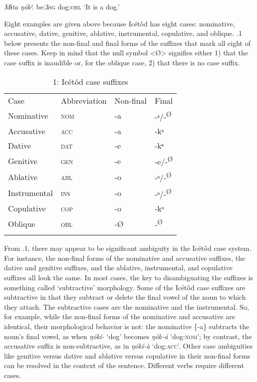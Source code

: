 \textit{Mɨta}     \textit{ŋók}\textit{ⁱ}.
be:\textsc{3sg}  dog:\textsc{obl}
‘It is a dog.’


Eight examples are given above because Icétôd has eight cases: nominative, accusative, dative, genitive, ablative, instrumental, copulative, and oblique. .1 below presents the non-final and final forms of the suffixes that mark all eight of these cases. Keep in mind that the null symbol <Ø> signifies either 1) that the case suffix is inaudible or, for the oblique case, 2) that there is no case suffix. 


\begin{table}
\caption{1: Icétôd case suffixes}
\label{tab:7}


\begin{tabularx}{\textwidth}{XXXX}
\lsptoprule

Case & Abbreviation & Non-final & Final\\
Nominative & \textsc{nom} & {}-a & {}-ᵃ/-\textsuperscript{Ø}\\
Accusative & \textsc{acc} & {}-a & {}-kᵃ\\
Dative & \textsc{dat} & {}-e & {}-kᵉ\\
Genitive & \textsc{gen} & {}-e & {}-e/-\textsuperscript{Ø}\\
Ablative & \textsc{abl} & {}-o & {}-ᵒ/-\textsuperscript{Ø}\\
Instrumental & \textsc{ins} & {}-o & {}-ᵒ/-\textsuperscript{Ø}\\
Copulative & \textsc{cop} & {}-o & {}-kᵒ\\
Oblique & \textsc{obl} & {}-Ø & {}-\textsuperscript{Ø}\\
\lspbottomrule
\end{tabularx}
\end{table}
From .1, there may appear to be significant ambiguity in the Icétôd case system. For instance, the non-final forms of the nominative and accusative suffixes, the dative and genitive suffixes, and the ablative, instrumental, and copulative suffixes all look the same. In most cases, the key to disambiguating the suffixes is something called ‘subtractive’\textsc{ }morphology. Some of the Icétôd case suffixes are subtractive in that they subtract or delete the final vowel of the noun to which they attach. The subtractive cases are the nominative and the instrumental. So, for example, while the non-final forms of the nominative and accusative are identical, their morphological behavior is not: the nominative \{-a\} subtracts the noun’s final vowel, as when \textit{ŋókí- }‘dog’ becomes \textit{ŋók-á }‘dog:\textsc{nom}’; by contrast, the accusative suffix is non-subtractive, as in \textit{ŋókí-à }‘dog:\textsc{acc}’. Other case ambiguities like genitive versus dative and ablative versus copulative in their non-final forms can be resolved in the context of the sentence. Different verbs require different cases.

